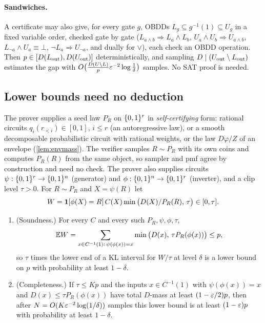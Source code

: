 \paragraph{Sandwiches.}
A certificate may also give, for every gate $g$, OBDDs $L_g\subseteq
g^{-1}(1)\subseteq U_g$ in a fixed variable order, checked gate by gate
($L_{a\wedge b}\Rightarrow L_a\wedge L_b$, $U_a\wedge U_b\Rightarrow U_{a\wedge b}$,
$L_{\neg a}\wedge U_a\equiv\bot$, $\neg L_a\Rightarrow U_{\neg a}$, and dually for
$\vee$), each check an OBDD operation. Then $p\in[D(L_{\rm out}),D(U_{\rm
out})]$ deterministically, and sampling $D\mid(U_{\rm out}\setminus L_{\rm out})$
estimates the gap with $O\big(\frac{D(U\setminus L)}{p}\varepsilon^{-2}\log\frac1\delta\big)$
samples. No SAT proof is needed.

\subsection{Lower bounds need no deduction}\label{sec:lower}

\begin{proposition}\label{prop:proposal}
The prover supplies a seed law $P_R$ on $\{0,1\}^r$ in \emph{self-certifying}
form: rational circuits $q_i(r_{<i})\in[0,1]$, $i\le r$ (an autoregressive
law), or a smooth decomposable probabilistic circuit with rational weights, or
the law $D\varphi/Z$ of an envelope (\cref{lem:envmass}). The verifier samples
$R\sim P_R$ with its own coins and computes $P_R(R)$ from the same object, so
sampler and pmf agree by construction and need no check. The prover also
supplies circuits $\psi:\{0,1\}^r\to\{0,1\}^n$ (generator) and
$\phi:\{0,1\}^n\to\{0,1\}^r$ (inverter), and a clip level $\tau>0$. For
$R\sim P_R$ and $X=\psi(R)$ let
\[
W=\mathbf{1}[\phi(X)=R]\,C(X)\min\big(D(X)/P_R(R),\,\tau\big)\in[0,\tau].
\]
\begin{enumerate}[label=(\alph*)]
\item (Soundness.) For every $C$ and every such $P_R,\psi,\phi,\tau$,
\[
\mathbb{E} W=\sum_{x\in C^{-1}(1):\,\psi(\phi(x))=x}\min\big(D(x),\,\tau P_R(\phi(x))\big)\le p,
\]
so $\tau$ times the lower end of a KL interval for $W/\tau$ at level $\delta$
is a lower bound on $p$ with probability at least $1-\delta$.
\item (Completeness.) If $\tau\le Kp$ and the inputs $x\in C^{-1}(1)$ with
$\psi(\phi(x))=x$ and $D(x)\le\tau P_R(\phi(x))$ have total $D$-mass at least
$(1-\varepsilon/2)p$, then after $N=O(K\varepsilon^{-2}\log(1/\delta))$ samples this lower
bound is at least $(1-\varepsilon)p$ with probability at least $1-\delta$.
\end{enumerate}
\end{proposition}

